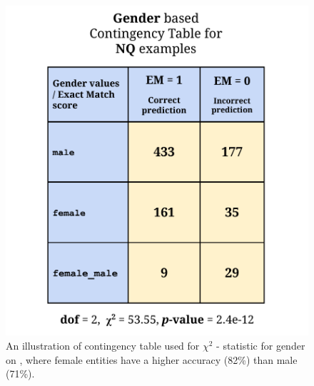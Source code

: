 \begin{figure}[h]
  \includegraphics[width=\linewidth]{2021_emnlp_qa_fairness/figures/contingency_table.pdf}
  \caption{
  An illustration of contingency table used for $\chi^2$ - statistic for gender on \nq{}, where female entities have a higher accuracy (82\%) than male (71\%).}
  \label{fig:contingency}
\end{figure} 
